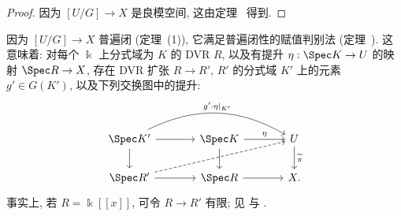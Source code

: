 \begin{proof}
因为 $[U/G]\to X$ 是良模空间, 这由定理~ 得到.
\end{proof}
\begin{remark}\label{src:8.1.4}
因为 $[U/G]\to X$ 普遍闭 (定理~(1)), 它满足普遍闭性的赋值判别法 (定理~). 这意味着: 对每个 $\Bbbk$ 上分式域为 $K$ 的 DVR $R$, 以及有提升 $\eta:\Spec K\to U$ 的映射 $\Spec R\to X$, 存在 DVR 扩张 $R\to R'$, $R'$ 的分式域 $K'$ 上的元素 $g'\in G(K')$, 以及下列交换图中的提升:
\[
\begin{tikzcd}[ampersand replacement=\&,column sep=large]
\Spec K'\arrow[r]\arrow[d]\arrow[rr,bend left=28,"{g'\cdot\eta|_{K'}}"]\&\Spec K\arrow[r,"\eta"]\arrow[d]\&U\arrow[d,"\widetilde\pi"]\\
\Spec R'\arrow[r]\arrow[urr,dashed]\&\Spec R\arrow[r]\&X.
\end{tikzcd}
\]
事实上, 若 $R=\Bbbk[\![x]\!]$, 可令 $R\to R'$ 有限; 见 \cite[引理 5.3]{Mum77} 与 \cite[定理 A.8]{AHLH23}.
\end{remark}
